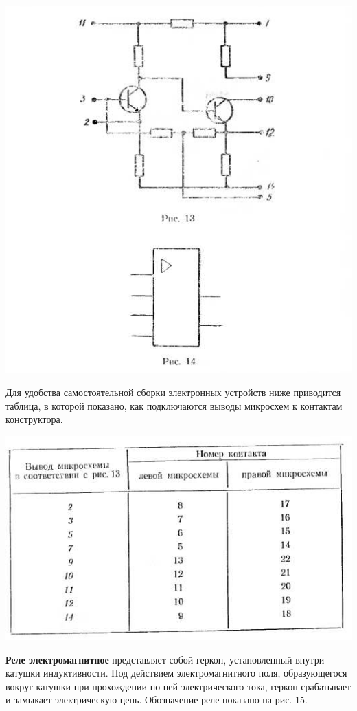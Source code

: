 \documentclass[12pt]{article}
\begin{document}
\includegraphics[scale=0.87]{ekon3_013_1}

Для удобства самостоятельной сборки электронных устройств ниже приводится таблица, в которой показано, как подключаются выводы микросхем к контактам конструктора.

\newpage

\includegraphics[scale=0.85, angle=-1]{ekon3_012_1}

\textbf{Реле электромагнитное} представляет собой геркон, установленный внутри катушки индуктивности. Под действием электромагнитного поля, образующегося вокруг катушки при прохождении по ней электрического тока, геркон срабатывает и замыкает электрическую цепь. Обозначение реле показано на рис. 15.
\end{document}
